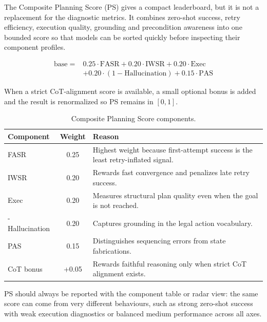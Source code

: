 The Composite Planning Score (PS) gives a compact leaderboard, but it is not a replacement for the diagnostic metrics. It combines zero-shot success, retry efficiency, execution quality, grounding and precondition awareness into one bounded score so that models can be sorted quickly before inspecting their component profiles.

\begin{bmformulabox}
\begin{align*}
\mathrm{base} ={}& 0.25\cdot\mathrm{FASR} +0.20\cdot\mathrm{IWSR} +0.20\cdot\mathrm{Exec}\\
&+0.20\cdot(1-\mathrm{Hallucination}) +0.15\cdot\mathrm{PAS}
\end{align*}
\end{bmformulabox}

When a strict CoT-alignment score is available, a small optional bonus is added and the result is renormalized so PS remains in \([0,1]\).

\begin{table}[H]\small
\centering
\begin{tabularx}{\linewidth}{@{}l c Y@{}}
\toprule
\textbf{Component} & \textbf{Weight} & \textbf{Reason}\\
\midrule
FASR & 0.25 & Highest weight because first-attempt success is the least retry-inflated signal.\\
\addlinespace
IWSR & 0.20 & Rewards fast convergence and penalizes late retry success.\\
\addlinespace
Exec & 0.20 & Measures structural plan quality even when the goal is not reached.\\
 - Hallucination & 0.20 & Captures grounding in the legal action vocabulary.\\
\addlinespace
PAS & 0.15 & Distinguishes sequencing errors from state fabrications.\\
\addlinespace
CoT bonus & +0.05 & Rewards faithful reasoning only when strict CoT alignment exists.\\
\bottomrule
\end{tabularx}
\caption{Composite Planning Score components.}
\label{tab:ps-components-compact}
\end{table}

PS should always be reported with the component table or radar view: the same score can come from very different behaviours, such as strong zero-shot success with weak execution diagnostics or balanced medium performance across all axes.